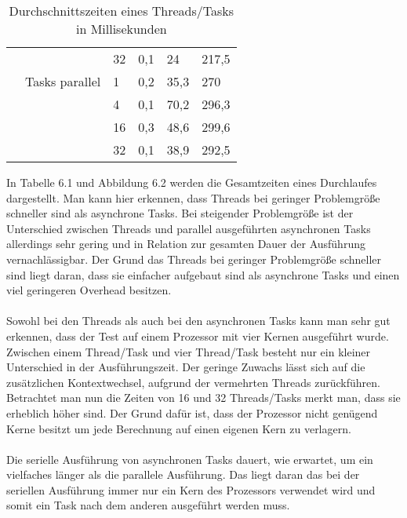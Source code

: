 \begin{table}[h]
\begin{tabular}{|l|l|l|l|l|l|}
                                     &                   & 32 & 0,1                  & 24                   & 217,5                \\ \cline{2-6} 
                                     & Tasks parallel    & 1  & 0,2                  & 35,3                 & 270                  \\ \cline{2-6} 
                                     & \multirow{3}{*}{} & 4  & 0,1                  & 70,2                 & 296,3                \\ \cline{3-6} 
                                     &                   & 16 & 0,3                  & 48,6                 & 299,6                \\ \cline{3-6} 
                                     &                   & 32 & 0,1                  & 38,9                 & 292,5                \\ \hline
\end{tabular}
\caption{Durchschnittszeiten eines Threads/Tasks in Millisekunden}
\label{table:averagetime}
\end{table}
In Tabelle 6.1 und Abbildung 6.2 werden die Gesamtzeiten eines Durchlaufes dargestellt. Man kann hier erkennen, dass Threads bei geringer Problemgröße schneller sind als asynchrone Tasks. Bei steigender Problemgröße ist der Unterschied zwischen Threads und parallel ausgeführten asynchronen Tasks allerdings sehr gering und in Relation zur gesamten Dauer der Ausführung vernachlässigbar. Der Grund das Threads bei geringer Problemgröße schneller sind liegt daran, dass sie einfacher aufgebaut sind als asynchrone Tasks und einen viel geringeren Overhead besitzen.
\\
\\
Sowohl bei den Threads als auch bei den asynchronen Tasks kann man sehr gut erkennen, dass der Test auf einem Prozessor mit vier Kernen ausgeführt wurde. Zwischen einem Thread/Task und vier Thread/Task besteht nur ein kleiner Unterschied in der Ausführungszeit. Der geringe Zuwachs lässt sich auf die zusätzlichen Kontextwechsel, aufgrund der vermehrten Threads zurückführen. Betrachtet man nun die Zeiten von 16 und 32 Threads/Tasks merkt man, dass sie erheblich höher sind. Der Grund dafür ist, dass der Prozessor nicht genügend Kerne besitzt um jede Berechnung auf einen eigenen Kern zu verlagern.
\\
\\
Die serielle Ausführung von asynchronen Tasks dauert, wie erwartet, um ein vielfaches länger als die parallele Ausführung. Das liegt daran das bei der seriellen Ausführung immer nur ein Kern des Prozessors verwendet wird und somit ein Task nach dem anderen ausgeführt werden muss.

